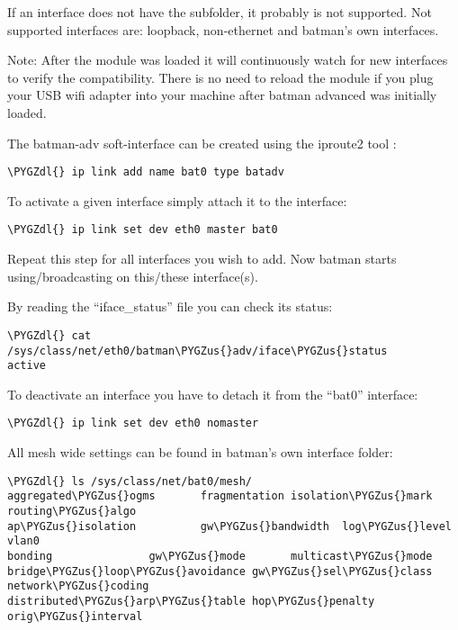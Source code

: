 \documentclass[a4paper,8pt,english]{sphinxmanual}
\def\PYGZus{\char`\_}
\def\PYGZdl{\char`\$}
\begin{document}
If an interface does not have the  subfolder, it probably is not
supported. Not supported interfaces are: loopback, non-ethernet and batman's
own interfaces.

Note: After the module was loaded it will continuously watch for new
interfaces to verify the compatibility. There is no need to reload the module
if you plug your USB wifi adapter into your machine after batman advanced was
initially loaded.

The batman-adv soft-interface can be created using the iproute2 tool :

\begin{Verbatim}[commandchars=\\\{\}]
\PYGZdl{} ip link add name bat0 type batadv
\end{Verbatim}

To activate a given interface simply attach it to the  interface:

\begin{Verbatim}[commandchars=\\\{\}]
\PYGZdl{} ip link set dev eth0 master bat0
\end{Verbatim}

Repeat this step for all interfaces you wish to add. Now batman starts
using/broadcasting on this/these interface(s).

By reading the ``iface\_status'' file you can check its status:

\begin{Verbatim}[commandchars=\\\{\}]
\PYGZdl{} cat /sys/class/net/eth0/batman\PYGZus{}adv/iface\PYGZus{}status
active
\end{Verbatim}

To deactivate an interface you have to detach it from the ``bat0'' interface:

\begin{Verbatim}[commandchars=\\\{\}]
\PYGZdl{} ip link set dev eth0 nomaster
\end{Verbatim}

All mesh wide settings can be found in batman's own interface folder:

\begin{Verbatim}[commandchars=\\\{\}]
\PYGZdl{} ls /sys/class/net/bat0/mesh/
aggregated\PYGZus{}ogms       fragmentation isolation\PYGZus{}mark routing\PYGZus{}algo
ap\PYGZus{}isolation          gw\PYGZus{}bandwidth  log\PYGZus{}level      vlan0
bonding               gw\PYGZus{}mode       multicast\PYGZus{}mode
bridge\PYGZus{}loop\PYGZus{}avoidance gw\PYGZus{}sel\PYGZus{}class  network\PYGZus{}coding
distributed\PYGZus{}arp\PYGZus{}table hop\PYGZus{}penalty   orig\PYGZus{}interval
\end{Verbatim}
\end{document}
